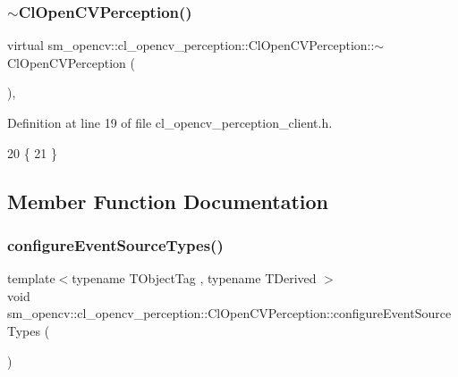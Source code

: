 \subsubsection{\texorpdfstring{$\sim$\+Cl\+Open\+C\+V\+Perception()}{~ClOpenCVPerception()}}
{\footnotesize\ttfamily virtual sm\+\_\+opencv\+::cl\+\_\+opencv\+\_\+perception\+::\+Cl\+Open\+C\+V\+Perception\+::$\sim$\+Cl\+Open\+C\+V\+Perception (\begin{DoxyParamCaption}{ }\end{DoxyParamCaption})\hspace{0.3cm}{\ttfamily [inline]}, {\ttfamily [virtual]}}



Definition at line 19 of file cl\+\_\+opencv\+\_\+perception\+\_\+client.\+h.


\begin{DoxyCode}
20   \{
21   \}
\end{DoxyCode}


\subsection{Member Function Documentation}
\mbox{\label{classsm__opencv_1_1cl__opencv__perception_1_1ClOpenCVPerception_ae518d17771e363f959b29d44f8f76a13}} 
\subsubsection{\texorpdfstring{configure\+Event\+Source\+Types()}{configureEventSourceTypes()}}
{\footnotesize\ttfamily template$<$typename T\+Object\+Tag , typename T\+Derived $>$ \\
void sm\+\_\+opencv\+::cl\+\_\+opencv\+\_\+perception\+::\+Cl\+Open\+C\+V\+Perception\+::configure\+Event\+Source\+Types (\begin{DoxyParamCaption}{ }\end{DoxyParamCaption})\hspace{0.3cm}{\ttfamily [inline]}}



